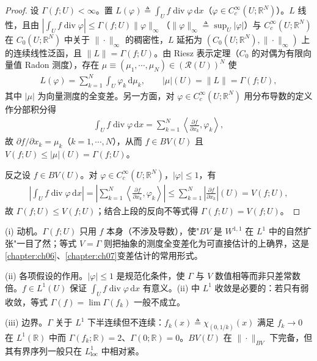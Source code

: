 \documentclass[../../main.tex]{subfiles}%
\begin{document}
\begin{proof}
设 $\Gamma(f;U)<\infty$。置 $L(\varphi)\triangleq\int_Uf\operatorname{div}\varphi\,\mathrm{d}x$（$\varphi\in C^\infty_c(U;\mathbb{R}^N)$）。$L$ 线性，且由 $|\int_Uf\operatorname{div}\varphi|\leqslant\Gamma(f;U)\|\varphi\|_\infty$（$\|\varphi\|_\infty\triangleq\sup_U|\varphi|$）与 $C^\infty_c(U;\mathbb{R}^N)$ 在 $C_0(U;\mathbb{R}^N)$ 中关于 $\|\cdot\|_\infty$ 的稠密性，$L$ 延拓为 $(C_0(U;\mathbb{R}^N),\|\cdot\|_\infty)$ 上的连续线性泛函，且 $\|L\|=\Gamma(f;U)$。由 Riesz 表示定理（$C_0$ 的对偶为有限向量值 Radon 测度），存在 $\mu\equiv(\mu_1,\cdots ,\mu_N)\in(\mathscr{R}(U))^N$ 使
\begin{align*}
L(\varphi)=\sum_{k=1}^N\int_U\varphi_k\,\mathrm{d}\mu_k,\qquad |\mu|(U)=\|L\|=\Gamma(f;U),
\end{align*}
其中 $|\mu|$ 为向量测度的全变差。另一方面，对 $\varphi\in C^\infty_c(U;\mathbb{R}^N)$ 用分布导数的定义作分部积分得
\begin{align*}
\int_Uf\operatorname{div}\varphi\,\mathrm{d}x=\sum_{k=1}^N\left\langle\frac{\partial f}{\partial x_k},\varphi_k\right\rangle,
\end{align*}
故 $\partial f/\partial x_k=\mu_k$（$k=1,\cdots ,N$），从而 $f\in BV(U)$ 且 $V(f;U)\leqslant|\mu|(U)=\Gamma(f;U)$。

反之设 $f\in BV(U)$。对 $\varphi\in C^\infty_c(U;\mathbb{R}^N)$，$|\varphi|\leqslant1$，有
\begin{align*}
\left|\int_Uf\operatorname{div}\varphi\,\mathrm{d}x\right|=\left|\sum_{k=1}^N\left\langle\frac{\partial f}{\partial x_k},\varphi_k\right\rangle\right|\leqslant\sum_{k=1}^N\left|\frac{\partial f}{\partial x_k}\right|(U)=V(f;U),
\end{align*}
故 $\Gamma(f;U)\leqslant V(f;U)$；结合上段的反向不等式得 $\Gamma(f;U)=V(f;U)$。
\end{proof}

\begin{remark}\label{remark:ch03-BV等价动机}
(i) 动机。$\Gamma(f;U)$ 只用 $f$ 本身（不涉及导数），使"$BV$ 是 $W^{1,1}$ 在 $L^1$ 中的自然扩张"一目了然；等式 $V=\Gamma$ 则把抽象的测度全变差化为可直接估计的上确界，这是\cref{chapter:ch06}、\cref{chapter:ch07}变差估计的常用形式。

(ii) 各项假设的作用。$|\varphi|\leqslant1$ 是规范化条件，使 $\Gamma$ 与 $V$ 数值相等而非只差常数倍。$f\in L^1(U)$ 保证 $\int_Uf\operatorname{div}\varphi\,\mathrm{d}x$ 有意义。(ii) 中 $L^1$ 收敛是必要的：若只有弱收敛，等式 $\Gamma(f)=\lim\Gamma(f_k)$ 一般不成立。

(iii) 边界。$\Gamma$ 关于 $L^1$ 下半连续但不连续：$f_k(x)\triangleq\chi_{(0,1/k)}(x)$ 满足 $f_k\to0$ 在 $L^1(\mathbb{R})$ 中而 $\Gamma(f_k;\mathbb{R})=2$、$\Gamma(0;\mathbb{R})=0$。$BV(U)$ 在 $\|\cdot\|_{BV}$ 下完备，但其有界序列一般只在 $L^1_{\mathrm{loc}}$ 中相对紧。
\end{remark}
\end{document}
